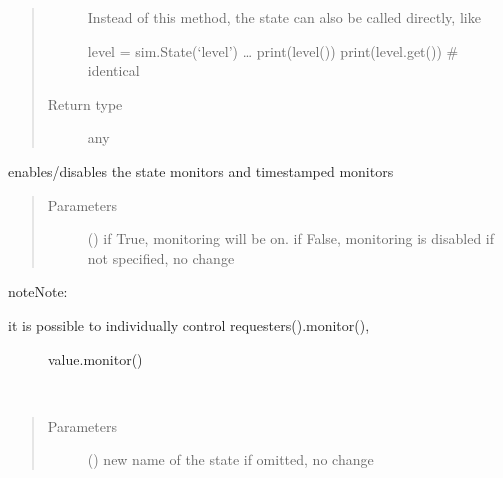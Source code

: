 \documentclass[letterpaper,10pt,english]{sphinxmanual}
\begin{document}
\begin{fulllineitems}
\begin{fulllineitems}
\begin{quote}
\begin{description}
 \textendash{} Instead of this method, the state can also be called directly, like 

level = sim.State(‘level’) 
… 
print(level()) 
print(level.get())  \# identical 


\item[{Return type}] \leavevmode
any

\end{description}\end{quote}

\end{fulllineitems}


\begin{fulllineitems}
\label{\detokenize{Reference:salabim.State.monitor}}
enables/disables the state monitors and timestamped monitors
\begin{quote}\begin{description}
\item[{Parameters}] \leavevmode
{} () \textendash{} if True, monitoring will be on. 
if False, monitoring is disabled 
if not specified, no change

\end{description}\end{quote}

\begin{sphinxadmonition}{note}{Note:}\begin{description}
\item[{it is possible to individually control requesters().monitor(),}] \leavevmode
value.monitor()

\end{description}
\end{sphinxadmonition}

\end{fulllineitems}


\begin{fulllineitems}
\label{\detokenize{Reference:salabim.State.name}}~\begin{quote}\begin{description}
\item[{Parameters}] \leavevmode
{} () \textendash{} new name of the state
if omitted, no change


\end{description}
\end{quote}
\end{fulllineitems}
\end{fulllineitems}
\end{document}
